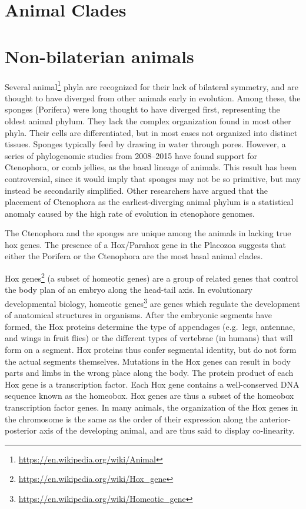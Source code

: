 \documentclass[]{book}
\let\rmarkdownfootnote\footnote%
\def\footnote{\protect\rmarkdownfootnote}
\renewcommand{\href}[2]{#2\footnote{\url{#1}}}
\begin{document}
\hypertarget{animal-clades}{%
\section{Animal Clades}\label{animal-clades}}

\hypertarget{non-bilaterian-animals}{%
\section{Non-bilaterian animals}\label{non-bilaterian-animals}}

Several \href{https://en.wikipedia.org/wiki/Animal}{animal} phyla are recognized for their lack of bilateral symmetry, and are thought to have diverged from other animals early in evolution. Among these, the sponges (Porifera) were long thought to have diverged first, representing the oldest animal phylum. They lack the complex organization found in most other phyla. Their cells are differentiated, but in most cases not organized into distinct tissues. Sponges typically feed by drawing in water through pores. However, a series of phylogenomic studies from 2008--2015 have found support for Ctenophora, or comb jellies, as the basal lineage of animals. This result has been controversial, since it would imply that sponges may not be so primitive, but may instead be secondarily simplified. Other researchers have argued that the placement of Ctenophora as the earliest-diverging animal phylum is a statistical anomaly caused by the high rate of evolution in ctenophore genomes.

The Ctenophora and the sponges are unique among the animals in lacking true hox genes. The presence of a Hox/Parahox gene in the Placozoa suggests that either the Porifera or the Ctenophora are the most basal animal clades.

\href{https://en.wikipedia.org/wiki/Hox_gene}{Hox genes} (a subset of homeotic genes) are a group of related genes that control the body plan of an embryo along the head-tail axis. In evolutionary developmental biology, \href{https://en.wikipedia.org/wiki/Homeotic_gene}{homeotic genes} are genes which regulate the development of anatomical structures in organisms. After the embryonic segments have formed, the Hox proteins determine the type of appendages (e.g.~legs, antennae, and wings in fruit flies) or the different types of vertebrae (in humans) that will form on a segment. Hox proteins thus confer segmental identity, but do not form the actual segments themselves. Mutations in the Hox genes can result in body parts and limbs in the wrong place along the body. The protein product of each Hox gene is a transcription factor. Each Hox gene contains a well-conserved DNA sequence known as the homeobox. Hox genes are thus a subset of the homeobox transcription factor genes. In many animals, the organization of the Hox genes in the chromosome is the same as the order of their expression along the anterior-posterior axis of the developing animal, and are thus said to display co-linearity.
\end{document}
